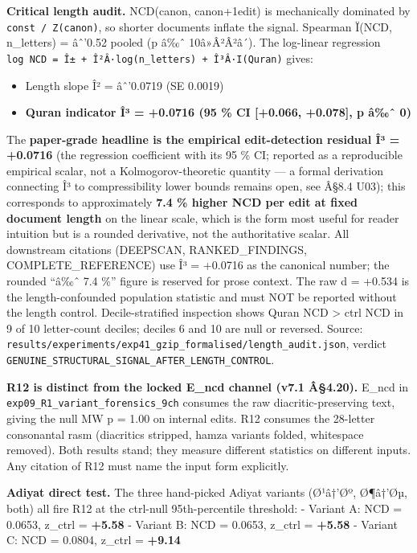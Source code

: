 \documentclass[
]{article}
\providecommand{\tightlist}{%
  \setlength{\itemsep}{0pt}\setlength{\parskip}{0pt}}
\begin{document}
\textbf{Critical length audit.} NCD(canon, canon+1edit) is mechanically
dominated by \texttt{const\ /\ Z(canon)}, so shorter documents inflate
the signal. Spearman Ï(NCD, n\_letters) = âˆ'0.52 pooled (p â‰ˆ
10â»Â²Â²â´). The log-linear regression
\texttt{log\ NCD\ =\ Î±\ +\ Î²Â·log(n\_letters)\ +\ Î³Â·I(Quran)} gives:

\begin{itemize}
\tightlist
\item
  Length slope Î² = âˆ'0.0719 (SE 0.0019)
\item
  \textbf{Quran indicator Î³ = +0.0716 (95 \% CI {[}+0.066, +0.078{]}, p
  â‰ˆ 0)}
\end{itemize}

The \textbf{paper-grade headline is the empirical edit-detection
residual Î³ = +0.0716} (the regression coefficient with its 95 \% CI;
reported as a reproducible empirical scalar, not a Kolmogorov-theoretic
quantity --- a formal derivation connecting Î³ to compressibility lower
bounds remains open, see Â§8.4 U03); this corresponds to approximately
\textbf{7.4 \% higher NCD per edit at fixed document length} on the
linear scale, which is the form most useful for reader intuition but is
a rounded derivative, not the authoritative scalar. All downstream
citations (DEEPSCAN, RANKED\_FINDINGS, COMPLETE\_REFERENCE) use Î³ =
+0.0716 as the canonical number; the rounded ``â‰ˆ 7.4 \%'' figure is
reserved for prose context. The raw d = +0.534 is the length-confounded
population statistic and must NOT be reported without the length
control. Decile-stratified inspection shows Quran NCD \textgreater{}
ctrl NCD in 9 of 10 letter-count deciles; deciles 6 and 10 are null or
reversed. Source:
\texttt{results/experiments/exp41\_gzip\_formalised/length\_audit.json},
verdict \texttt{GENUINE\_STRUCTURAL\_SIGNAL\_AFTER\_LENGTH\_CONTROL}.

\textbf{R12 is distinct from the locked E\_ncd channel (v7.1 Â§4.20).}
E\_ncd in \texttt{exp09\_R1\_variant\_forensics\_9ch} consumes the raw
diacritic-preserving text, giving the null MW p = 1.00 on internal
edits. R12 consumes the 28-letter consonantal rasm (diacritics stripped,
hamza variants folded, whitespace removed). Both results stand; they
measure different statistics on different inputs. Any citation of R12
must name the input form explicitly.

\textbf{Adiyat direct test.} The three hand-picked Adiyat variants
(Ø¹â†'Øº, Ø¶â†'Øµ, both) all fire R12 at the ctrl-null 95th-percentile
threshold: - Variant A: NCD = 0.0653, z\_ctrl = \textbf{+5.58} - Variant
B: NCD = 0.0653, z\_ctrl = \textbf{+5.58} - Variant C: NCD = 0.0804,
z\_ctrl = \textbf{+9.14}
\end{document}
